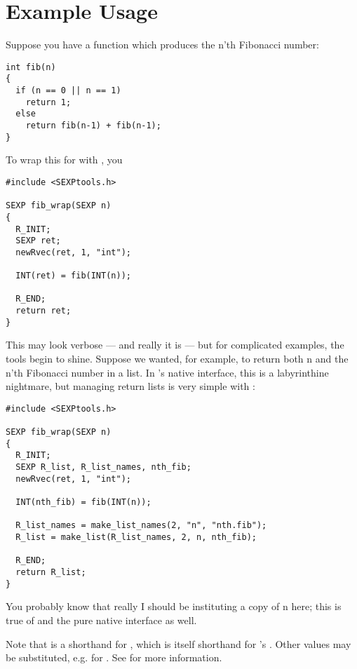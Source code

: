 \section{Example Usage}\label{example}

Suppose you have a \C function  which produces the n'th 
Fibonacci number:
\begin{lstlisting}[language=fanC,title=Fibonacci]
int fib(n)
{
  if (n == 0 || n == 1)
    return 1;
  else
    return fib(n-1) + fib(n-1);
}
\end{lstlisting}

To wrap this for \R with \thispackage, you 
\begin{lstlisting}[language=fanC,title=Fibonacci Wrapper]
#include <SEXPtools.h>

SEXP fib_wrap(SEXP n)
{
  R_INIT;
  SEXP ret;
  newRvec(ret, 1, "int");
  
  INT(ret) = fib(INT(n));
  
  R_END;
  return ret;
}
\end{lstlisting}

This may look verbose --- and really it is --- but for complicated examples, 
the tools begin to shine.  Suppose we wanted, for example, to return both n and 
the n'th Fibonacci number in a list.  In \R's native \C interface, this is a 
labyrinthine nightmare, but managing return lists is very simple with 
\thispackage:

\begin{lstlisting}[language=fanC,title=Fibonacci Wrapper 2]
#include <SEXPtools.h>

SEXP fib_wrap(SEXP n)
{
  R_INIT;
  SEXP R_list, R_list_names, nth_fib;
  newRvec(ret, 1, "int");
  
  INT(nth_fib) = fib(INT(n));
  
  R_list_names = make_list_names(2, "n", "nth.fib");
  R_list = make_list(R_list_names, 2, n, nth_fib);
  
  R_END;
  return R_list;
}
\end{lstlisting}

You probably know that really I should be instituting a copy of n here; this is 
true of  and the pure native \C interface as well.

Note that  is a shorthand for , which is itself 
shorthand for \R's .  Other values may be substituted, e.g. 
 for .  See  for more 
information.